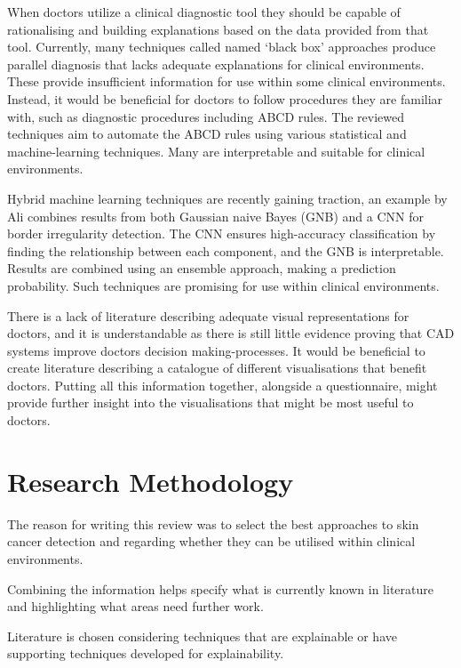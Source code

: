 When doctors utilize a clinical diagnostic tool they should be capable of rationalising and building explanations based on the data provided from that tool. Currently, many techniques\cite{Andre2017} called named `black box' approaches produce parallel diagnosis that lacks adequate explanations for clinical environments. These provide insufficient information for use within some clinical environments\cite{Andre2017}. Instead, it would be beneficial for doctors to follow procedures they are familiar with, such as diagnostic procedures including ABCD rules. The reviewed techniques aim to automate the ABCD rules using various statistical and machine-learning techniques. Many are interpretable and suitable for clinical environments.

Hybrid machine learning techniques are recently gaining traction, an example by Ali combines results from both Gaussian naive Bayes (GNB) and a CNN\cite{Ali2020b} for border irregularity detection. The CNN ensures high-accuracy classification by finding the relationship between each component, and the GNB is interpretable. Results are combined using an ensemble approach, making a prediction probability. Such techniques are promising for use within clinical environments.

There is a lack of literature describing adequate visual representations for doctors, and it is understandable as there is still little evidence proving that CAD systems improve doctors decision making-processes\cite{FerrantediRuffano2018}. It would be beneficial to create literature describing a catalogue of different visualisations that benefit doctors. Putting all this information together, alongside a questionnaire, might provide further insight into the visualisations that might be most useful to doctors.


\section{Research Methodology}
The reason for writing this review was to select the best approaches to skin cancer detection and regarding whether they can be utilised within clinical environments. 

Combining the information helps specify what is currently known in literature and highlighting what areas need further work.

Literature is chosen considering techniques that are explainable or have supporting techniques developed for explainability.

